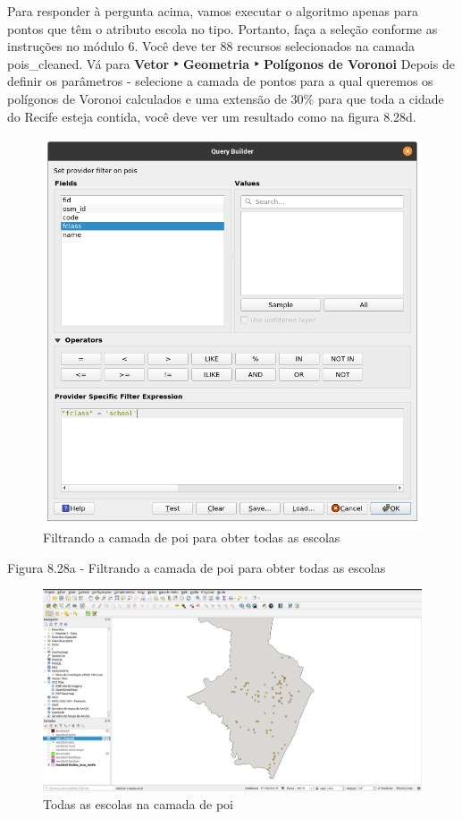 \documentclass[
]{book}
\begin{document}
Para responder à pergunta acima, vamos executar o algoritmo apenas para pontos que têm o atributo escola no tipo. Portanto, faça a seleção conforme as instruções no módulo 6. Você deve ter 88 recursos selecionados na camada pois\_cleaned. Vá para \textbf{Vetor ‣ Geometria ‣ Polígonos de Voronoi} Depois de definir os parâmetros - selecione a camada de pontos para a qual queremos os polígonos de Voronoi calculados e uma extensão de 30\% para que toda a cidade do Recife esteja contida, você deve ver um resultado como na figura 8.28d.

\begin{figure}
\centering
\includegraphics{media/modulo8/fig828_a.png}
\caption{Filtrando a camada de poi para obter todas as escolas}
\end{figure}

Figura 8.28a - Filtrando a camada de poi para obter todas as escolas

\begin{figure}
\centering
\includegraphics{media/modulo8/fig828_b.png}
\caption{Todas as escolas na camada de poi}
\end{figure}
\end{document}

